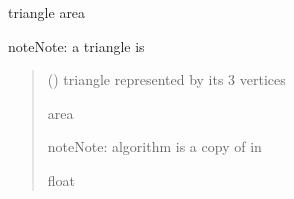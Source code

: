 \documentclass[letterpaper,10pt,english]{sphinxmanual}
\begin{document}
\begin{fulllineitems}
\label{\detokenize{reference:basicgeometry.triangle_area}}
\pysigstartsignatures
{}
\pysigstopsignatures
\sphinxAtStartPar
triangle area

\begin{sphinxadmonition}{note}{Note:}
\sphinxAtStartPar
a triangle is \sphinxcode{\sphinxupquote{{[}(x1,y1,z1),(x2,y2,z2),(x3,y3,z3){]}}}
\end{sphinxadmonition}
\begin{quote}\begin{description}
\sphinxAtStartPar
{} () \textendash{} triangle represented by its 3 vertices

\sphinxAtStartPar

\sphinxAtStartPar
area

\begin{sphinxadmonition}{note}{Note:}
\sphinxAtStartPar
algorithm is a copy of  in 
\end{sphinxadmonition}


\sphinxAtStartPar
float

\end{description}\end{quote}

\end{fulllineitems}

\end{document}

